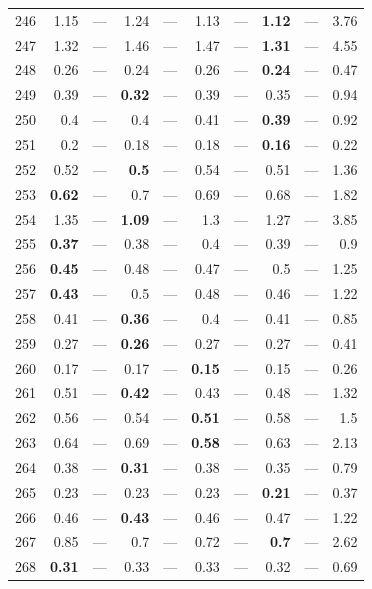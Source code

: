 \begin{longtable}{lr@{\hskip 4pt}l@{\hskip 12pt}r@{\hskip 4pt}l@{\hskip 12pt}r@{\hskip 4pt}l@{\hskip 12pt}r@{\hskip 4pt}l@{\hskip 12pt}r}
246 & 1.15 & --- & 1.24 & --- & 1.13 & --- & \textbf{1.12} & --- & 3.76 \\
247 & 1.32 & --- & 1.46 & --- & 1.47 & --- & \textbf{1.31} & --- & 4.55 \\
248 & 0.26 & --- & 0.24 & --- & 0.26 & --- & \textbf{0.24} & --- & 0.47 \\
249 & 0.39 & --- & \textbf{0.32} & --- & 0.39 & --- & 0.35 & --- & 0.94 \\
250 & 0.4 & --- & 0.4 & --- & 0.41 & --- & \textbf{0.39} & --- & 0.92 \\
251 & 0.2 & --- & 0.18 & --- & 0.18 & --- & \textbf{0.16} & --- & 0.22 \\
252 & 0.52 & --- & \textbf{0.5} & --- & 0.54 & --- & 0.51 & --- & 1.36 \\
253 & \textbf{0.62} & --- & 0.7 & --- & 0.69 & --- & 0.68 & --- & 1.82 \\
254 & 1.35 & --- & \textbf{1.09} & --- & 1.3 & --- & 1.27 & --- & 3.85 \\
255 & \textbf{0.37} & --- & 0.38 & --- & 0.4 & --- & 0.39 & --- & 0.9 \\
256 & \textbf{0.45} & --- & 0.48 & --- & 0.47 & --- & 0.5 & --- & 1.25 \\
257 & \textbf{0.43} & --- & 0.5 & --- & 0.48 & --- & 0.46 & --- & 1.22 \\
258 & 0.41 & --- & \textbf{0.36} & --- & 0.4 & --- & 0.41 & --- & 0.85 \\
259 & 0.27 & --- & \textbf{0.26} & --- & 0.27 & --- & 0.27 & --- & 0.41 \\
260 & 0.17 & --- & 0.17 & --- & \textbf{0.15} & --- & 0.15 & --- & 0.26 \\
261 & 0.51 & --- & \textbf{0.42} & --- & 0.43 & --- & 0.48 & --- & 1.32 \\
262 & 0.56 & --- & 0.54 & --- & \textbf{0.51} & --- & 0.58 & --- & 1.5 \\
263 & 0.64 & --- & 0.69 & --- & \textbf{0.58} & --- & 0.63 & --- & 2.13 \\
264 & 0.38 & --- & \textbf{0.31} & --- & 0.38 & --- & 0.35 & --- & 0.79 \\
265 & 0.23 & --- & 0.23 & --- & 0.23 & --- & \textbf{0.21} & --- & 0.37 \\
266 & 0.46 & --- & \textbf{0.43} & --- & 0.46 & --- & 0.47 & --- & 1.22 \\
267 & 0.85 & --- & 0.7 & --- & 0.72 & --- & \textbf{0.7} & --- & 2.62 \\
268 & \textbf{0.31} & --- & 0.33 & --- & 0.33 & --- & 0.32 & --- & 0.69 \\

\end{longtable}
